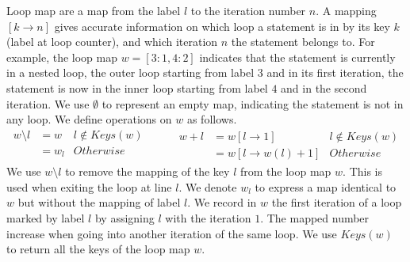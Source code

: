   Loop map are a map from the label $l$ to the iteration number $n$.
  A mapping $[k \to n]$ gives accurate information on which loop a statement is in by its key $k$ (label at loop counter), and which iteration $n$ the statement belongs to. For example, the loop map $w=[3:1, 4:2]$ indicates that the statement is currently in a nested loop, the outer loop starting from label $3$ and in its first iteration, the statement is now in the inner loop starting from label $4$ and in the second iteration. We use $\emptyset$ to represent an empty map, indicating the statement is not in any loop. We define operations on $w$ as follows.
\[
\begin{array}{lll}
w \setminus l     & = w  & l \not\in Keys(w)   \\
     & = w_l & Otherwise \\
\end{array} ~~~~~~~~~~~
\begin{array}{llll}
   w + l & = w[l \to 1] & l \not \in Keys(w) \\   
     & = w [l \to w(l)+1] & Otherwise
\end{array}
\]
We use $w \setminus l$ to remove the mapping of the key $l$ from the loop map $w$. This is used when exiting the loop at line $l$. We denote $w_l$ to express a map identical to $w$ but without the mapping of label $l$. We record in $w$ the first iteration of a loop marked by label $l$ by assigning $l$ with the iteration $1$. The mapped number increase when going into another iteration of the same loop. We use $Keys(w)$ to return all the keys of the loop map $w$.

